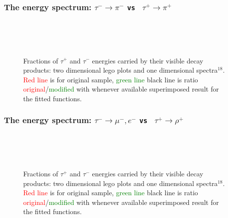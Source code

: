 \newpage
\subsubsection{The energy spectrum: $\tau^- \to \pi^-$ {\tt vs } $\tau^+ \to \pi^+$}
\vspace{3\baselineskip}

\begin{figure}[h!]
\centering
{}
 \\
 \\
 \\
\caption{\small Fractions of  $\tau^+$ and $\tau^-$ energies carried by their visible  decay products:
two dimensional lego plots and one dimensional spectra$^{18}$.
\textcolor{red}{Red line} is  for original sample,
\textcolor{green}{green line} \greenlineis
black line is ratio \textcolor{red}{original}/\textcolor{green}{modified} with whenever available superimposed result for the
fitted functions.
}\label{Fig:spectra2}%
\end{figure}

\newpage
\subsubsection{The energy spectrum: $\tau^- \to \mu^-, e^-$ {\tt vs } $\tau^+ \to \rho^+$}
\vspace{3\baselineskip}

\begin{figure}[h!]
\centering
{}
 \\
 \\
 \\
\caption{\small Fractions of  $\tau^+$ and $\tau^-$ energies carried by their visible  decay products:
two dimensional lego plots and one dimensional spectra$^{18}$.
\textcolor{red}{Red line} is  for original sample,
\textcolor{green}{green line} \greenlineis
black line is ratio \textcolor{red}{original}/\textcolor{green}{modified} with whenever available superimposed result for the
fitted functions.
}
\end{figure}

